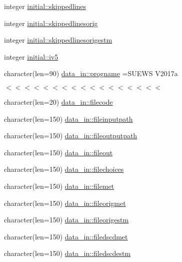 \begin{DoxyCompactItemize}
integer \hyperlink{namespaceinitial_ac8bbf58d250949afdd410ea446af2672}{initial\+::skippedlines}
\item 
integer \hyperlink{namespaceinitial_a10df3f69c115c80116ea720242fc42f0}{initial\+::skippedlinesorig}
\item 
integer \hyperlink{namespaceinitial_add6dafb7b5eb7b3be03f1ef5ea9ee0c7}{initial\+::skippedlinesorigestm}
\item 
integer \hyperlink{namespaceinitial_ac0085ee292167191015e55edc224e2d7}{initial\+::iv5}
\item 
character(len=90) \hyperlink{namespacedata__in_a7dd6ee68e2bde1c81c0ed1b6a6e9061b}{data\+\_\+in\+::progname} =\textquotesingle{}S\+U\+E\+WS V2017a\textquotesingle{}
\begin{DoxyCompactList}\small\item\em $<$$<$$<$$<$$<$$<$$<$$<$$<$$<$$<$$<$$<$$<$$<$$<$$<$ \end{DoxyCompactList}\item 
character(len=20) \hyperlink{namespacedata__in_a7f8949b7ebf799e7223eae9fd01a7749}{data\+\_\+in\+::filecode}
\item 
character(len=150) \hyperlink{namespacedata__in_a67f60bb1f8edd3c6be5380ab655fe7f1}{data\+\_\+in\+::fileinputpath}
\item 
character(len=150) \hyperlink{namespacedata__in_a62ca2dcc9ca96142df62a94056f96391}{data\+\_\+in\+::fileoutputpath}
\item 
character(len=150) \hyperlink{namespacedata__in_ac2b450671084fe099a448b9041377812}{data\+\_\+in\+::fileout}
\item 
character(len=150) \hyperlink{namespacedata__in_a06dcdca28402576db115b411e6a1f090}{data\+\_\+in\+::filechoices}
\item 
character(len=150) \hyperlink{namespacedata__in_a47dbe76dba82734e5409c2ee5cc0a1d8}{data\+\_\+in\+::filemet}
\item 
character(len=150) \hyperlink{namespacedata__in_aa954c0fba57d9145cc0c6336009d06bf}{data\+\_\+in\+::fileorigmet}
\item 
character(len=150) \hyperlink{namespacedata__in_a9cc7b5d1b7fbb824210f4f81d0498bd0}{data\+\_\+in\+::fileorigestm}
\item 
character(len=150) \hyperlink{namespacedata__in_ad0d0971b802f95d1a4fcc057771aee6b}{data\+\_\+in\+::filedscdmet}
\item 
character(len=150) \hyperlink{namespacedata__in_aae47ad70ed5c4116cec7838aaaaa302a}{data\+\_\+in\+::filedscdestm}
\item 

\end{DoxyCompactItemize}
